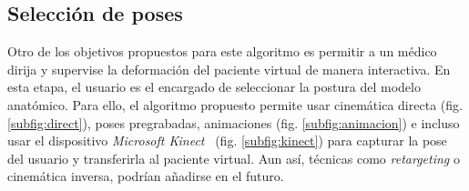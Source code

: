 \subsection{Selección de poses}
\label{posing:Poses}
%
Otro de los objetivos propuestos para este algoritmo es permitir a un médico dirija y supervise la deformación del paciente virtual de manera interactiva. %
En esta etapa, el usuario es el encargado de seleccionar la postura del modelo anatómico. Para ello, el algoritmo propuesto permite usar cinemática directa (fig. \ref{subfig:direct}), poses pregrabadas, animaciones (fig. \ref{subfig:animacion}) e incluso usar el dispositivo \emph{Microsoft Kinect}~\cite{shotton2013} (fig. \ref{subfig:kinect}) para capturar la pose del usuario y transferirla al paciente virtual. Aun así, técnicas como \emph{retargeting} \cite{7581666} o cinemática inversa, podrían añadirse en el futuro. %
